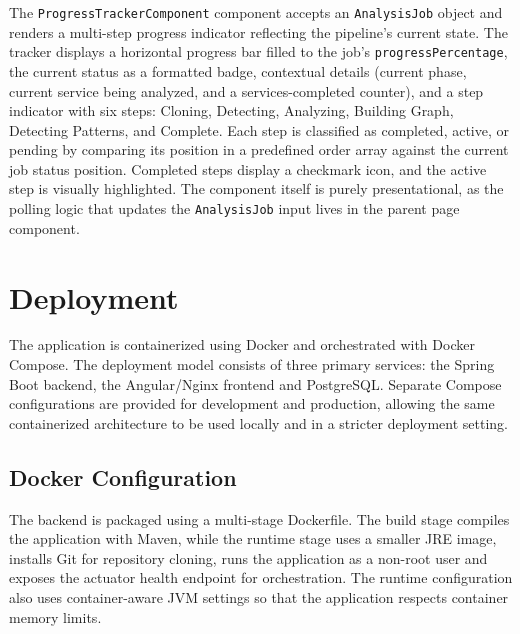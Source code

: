 \par The \texttt{ProgressTrackerComponent} component accepts an \texttt{AnalysisJob} object and renders a multi-step progress indicator reflecting the pipeline's current state. The tracker displays a horizontal progress bar filled to the job's \texttt{progress\-Per\-cen\-tage}, the current status as a formatted badge, contextual details (current phase, current service being analyzed, and a services-completed counter), and a step indicator with six steps: Cloning, Detecting, Analyzing, Building Graph, Detecting Patterns, and Complete. Each step is classified as completed, active, or pending by comparing its position in a predefined order array against the current job status position. Completed steps display a checkmark icon, and the active step is visually highlighted. The component itself is purely presentational, as the polling logic that updates the \texttt{AnalysisJob} input lives in the parent page component.
\fi

\section{Deployment}
\label{sec:deployment}

\par The application is containerized using Docker and orchestrated with Docker Compose. The deployment model consists of three primary services: the Spring Boot backend, the Angular/Nginx frontend and PostgreSQL. Separate Compose configurations are provided for development and production, allowing the same containerized architecture to be used locally and in a stricter deployment setting.

\subsection{Docker Configuration}
\label{subsec:docker-config}

\par The backend is packaged using a multi-stage Dockerfile. The build stage compiles the application with Maven, while the runtime stage uses a smaller JRE image, installs Git for repository cloning, runs the application as a non-root user and exposes the actuator health endpoint for orchestration. The runtime configuration also uses container-aware JVM settings so that the application respects container memory limits.

